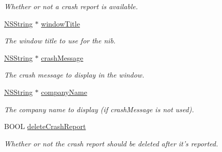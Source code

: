 \begin{DoxyCompactItemize}
\begin{DoxyCompactList}\small\item\em Whether or not a crash report is available. \item\end{DoxyCompactList}\item 
\hypertarget{interface_g_d_crash_reporter_a922f5439064019cacf7f3289e676d4fc}{
\hyperlink{class_n_s_string}{NSString} $\ast$ \hyperlink{interface_g_d_crash_reporter_a922f5439064019cacf7f3289e676d4fc}{windowTitle}}
\label{interface_g_d_crash_reporter_a922f5439064019cacf7f3289e676d4fc}

\begin{DoxyCompactList}\small\item\em The window title to use for the nib. \item\end{DoxyCompactList}\item 
\hypertarget{interface_g_d_crash_reporter_a49a7683ee87241ea65d1b96cd0b5a565}{
\hyperlink{class_n_s_string}{NSString} $\ast$ \hyperlink{interface_g_d_crash_reporter_a49a7683ee87241ea65d1b96cd0b5a565}{crashMessage}}
\label{interface_g_d_crash_reporter_a49a7683ee87241ea65d1b96cd0b5a565}

\begin{DoxyCompactList}\small\item\em The crash message to display in the window. \item\end{DoxyCompactList}\item 
\hypertarget{interface_g_d_crash_reporter_ad0a36e6854ffadd6104e30bbb1050791}{
\hyperlink{class_n_s_string}{NSString} $\ast$ \hyperlink{interface_g_d_crash_reporter_ad0a36e6854ffadd6104e30bbb1050791}{companyName}}
\label{interface_g_d_crash_reporter_ad0a36e6854ffadd6104e30bbb1050791}

\begin{DoxyCompactList}\small\item\em The company name to display (if crashMessage is not used). \item\end{DoxyCompactList}\item 
\hypertarget{interface_g_d_crash_reporter_a2555f6e1895ecb60ed3e2454c259ae42}{
BOOL \hyperlink{interface_g_d_crash_reporter_a2555f6e1895ecb60ed3e2454c259ae42}{deleteCrashReport}}
\label{interface_g_d_crash_reporter_a2555f6e1895ecb60ed3e2454c259ae42}

\begin{DoxyCompactList}\small\item\em Whether or not the crash report should be deleted after it's reported. \item\end{DoxyCompactList}\end{DoxyCompactItemize}


